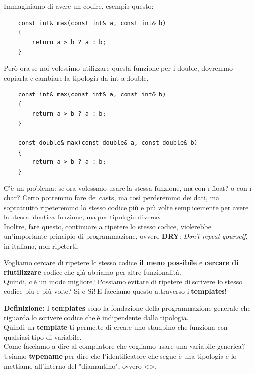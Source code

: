 \textsf{\small Immaginiamo di avere un codice, esempio questo:} \\

\begin{lstlisting}
	const int& max(const int& a, const int& b)
	{
		return a > b ? a : b;
	}
\end{lstlisting}

\textsf{\small Però ora se noi volessimo utilizzare questa funzione per i double, dovremmo copiarla e cambiare la tipologia da int a double.} \\

\begin{lstlisting}
	const int& max(const int& a, const int& b)
	{
		return a > b ? a : b;
	}

	const double& max(const double& a, const double& b)
	{
		return a > b ? a : b;
	}
\end{lstlisting}

\textsf{\small C'è un problema: se ora volessimo usare la stessa funzione, ma con i float? o con i char? Certo potremmo fare dei casts, ma così perderemmo dei dati, ma soprattutto ripeteremmo lo stesso codice più e più volte semplicemente per avere la stessa identica funzione, ma per tipologie diverse.} \\

\textsf{\small Inoltre, fare questo, continuare a ripetere lo stesso codice, violerebbe un'importante principio di programmazione, ovvero \textbf{DRY}: \emph{Don't repeat yourself}, in italiano, non ripeterti.} \break 

\textsf{\small Vogliamo cercare di ripetere lo stesso codice \textbf{il meno possibile} e \textbf{cercare di riutilizzare} codice che già abbiamo per altre funzionalità.} \\

\textsf{\small Quindi, c'è un modo migliore? Possiamo evitare di ripetere di scrivere lo stesso codice più e più volte? Si e Si! E facciamo questo attraverso i \textbf{templates}!} \break

\textsf{\small \textbf{Definizione:} I \textbf{templates} sono la fondazione della programmazione generale che riguarda lo scrivere codice che è indipendente dalla tipologia. } \\

\textsf{\small Quindi un \textbf{template} ti permette di creare uno stampino che funziona con qualsiasi tipo di variabile.} \\

\textsf{\small Come facciamo a dire al compilatore che vogliamo usare una variabile generica? Usiamo \textbf{typename} per dire che l'identificatore che segue è una tipologia e lo mettiamo all'interno del "diamantino", ovvero <>.} \\

